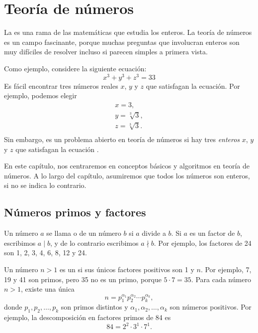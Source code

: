 \chapter{Teoría de números}


La  es una rama de las matemáticas
que estudia los enteros.
La teoría de números es un campo fascinante,
porque muchas preguntas que involucran enteros
son muy difíciles de resolver incluso si parecen
simples a primera vista.

Como ejemplo, considere la siguiente ecuación:
\[x^3 + y^3 + z^3 = 33\]
Es fácil encontrar tres números reales $x$, $y$ y $z$
que satisfagan la ecuación.
Por ejemplo, podemos elegir
\[
\begin{array}{lcl}
x = 3, \\
y = \sqrt[3]{3}, \\
z = \sqrt[3]{3}.\\
\end{array}
\]
Sin embargo, es un problema abierto en teoría de números
si hay tres
\emph{enteros} $x$, $y$ y $z$
que satisfagan la ecuación \cite{bec07}.

En este capítulo, nos centraremos en conceptos básicos
y algoritmos en teoría de números.
A lo largo del capítulo, asumiremos que todos los números
son enteros, si no se indica lo contrario.

\section{Números primos y factores}


Un número $a$ se llama  o  de un número $b$
si $a$ divide a $b$.
Si $a$ es un factor de $b$,
escribimos $a \mid b$, y de lo contrario escribimos $a \nmid b$.
Por ejemplo, los factores de 24 son
1, 2, 3, 4, 6, 8, 12 y 24.


Un número $n>1$ es un 
si sus únicos factores positivos son 1 y $n$.
Por ejemplo, 7, 19 y 41 son primos,
pero 35 no es un primo, porque $5 \cdot 7 = 35$.
Para cada número $n>1$, existe una única
\[ n = p_1^{\alpha_1} p_2^{\alpha_2} \cdots p_k^{\alpha_k},\]
donde $p_1,p_2,\ldots,p_k$ son primos distintos y
$\alpha_1,\alpha_2,\ldots,\alpha_k$ son números positivos.
Por ejemplo, la descomposición en factores primos de 84 es
\[84 = 2^2 \cdot 3^1 \cdot 7^1.\]

